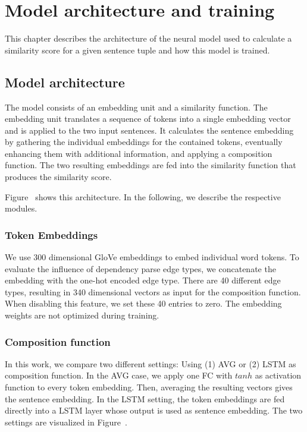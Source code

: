 \section{Model architecture and training}
This chapter describes the architecture of the neural model used to calculate a similarity score for a given sentence tuple and how this model is trained.

\subsection{Model architecture}
The model consists of an embedding unit and a similarity function. The embedding unit translates a sequence of tokens into a single embedding vector and is applied to the two input sentences. It calculates the sentence embedding by gathering the individual embeddings for the contained tokens, eventually enhancing them with additional information, and applying a composition function. The two resulting embeddings are fed into the similarity function that produces the similarity score. 

Figure~ shows this architecture. In the following, we describe the respective modules. 

\subsubsection{Token Embeddings}
We use 300 dimensional GloVe embeddings  \autocite{pennington_glove_2014} to embed individual word tokens. To evaluate the influence of dependency parse edge types, we concatenate the embedding with the one-hot encoded edge type. There are 40 different edge types, resulting in 340 dimensional vectors as input for the composition function. When disabling this feature, we set these 40 entries to zero. The embedding weights are not optimized during training.   

\subsubsection{Composition function}
In this work, we compare two different settings: Using (1) \acf{AVG} or (2) \acf{LSTM} as composition function. 
In the \ac{AVG} case, we apply one \acf{FC} with $tanh$ as activation function to every token embedding. Then, averaging the resulting vectors gives the sentence embedding.
In the \ac{LSTM} setting, the token embeddings are fed directly into a LSTM layer whose output is used as sentence embedding. The two settings are visualized in Figure~.

